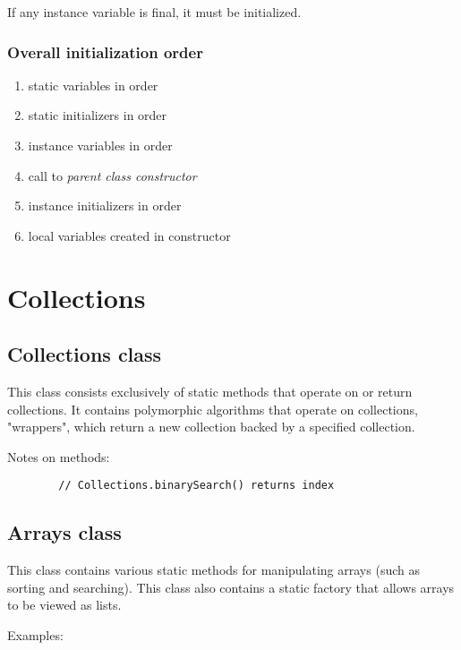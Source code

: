 \documentclass{scrartcl}
\begin{document}
    If any instance variable is final, it must be initialized.

\subsubsection{Overall initialization order}

    \begin{enumerate}
        \item static variables in order
        \item static initializers in order
        \item instance variables in order
        \item call to \textit{parent class constructor}
        \item instance initializers in order
        \item local variables created in constructor
    \end{enumerate}

\section{Collections}

\subsection{Collections class}

    This class consists exclusively of static methods that operate on or return collections. It contains polymorphic algorithms that operate on collections, "wrappers", which return a new collection backed by a specified collection.

    Notes on methods:

    \begin{lstlisting}
        // Collections.binarySearch() returns index

    \end{lstlisting}

\subsection{Arrays class}

    This class contains various static methods for manipulating arrays (such as sorting and searching). This class also contains a static factory that allows arrays to be viewed as lists.

    Examples:
\end{document}
